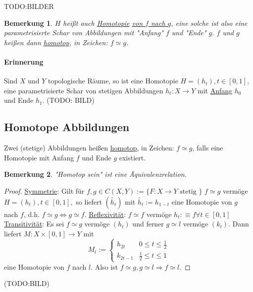 \documentclass[a4paper,11pt,notitlepage]{report}
\newtheorem{remark}{Bemerkung}[chapter]
\newenvironment{Kasten}[1]
{
\hspace{0.05\linewidth}
\begin{center}
\begin{minipage}{0.9\linewidth}
\setlength{\fboxsep}{10pt}
\definecolor{shadecolor}{gray}{1}
\definecolor{framecolor}{gray}{0}
\def\FrameCommand{\fcolorbox{framecolor}{shadecolor}}
\MakeFramed {\FrameRestore}
\subsection{#1}
\begin{itshape}
}
{
\end{itshape}
\endMakeFramed
\end{minipage}
\end{center}
}
\begin{document}
TODO:BILDER

\begin{remark}
$H$ heißt auch \underline{Homotopie} \underline{\underline{von $f$ nach $g$}}, eine solche ist also eine parametrisierte Schar von Abbildungen mit "Anfang" $f$ und "Ende" $g$. $f$ und $g$ heißen dann \underline{homotop}, in Zeichen: $f \simeq g$.
\end{remark}

\paragraph{Erinnerung}
Sind $X$ und $Y$ topologische Räume, so ist eine Homotopie $H = (h_t), t \in [0,1]$, eine parametrisierte Schar von stetigen Abbildungen $h_t \colon X \rightarrow Y$ mit \underline{Anfang} $h_0$ und Ende $h_1$. (TODO: BILD)

\begin{Kasten}{Homotope Abbildungen}
	Zwei (stetige) Abbildungen heißen \underline{homotop}, in Zeichen: $f \simeq g$, falls eine Homotopie mit Anfang $f$ und Ende $g$ existiert.
\end{Kasten}

\begin{remark}
"Homotop sein" ist eine Äquivalenzrelation.
\end{remark}

\begin{proof}
	\underline{Symmetrie}:
	Gilt für $f,g \in C(X,Y) := \{F \colon X \rightarrow Y \text{ stetig } \}$ $f \simeq g$ vermöge $H=(h_t), t \in [0,1],$ so liefert $(\tilde{h_t})$ mit $\tilde{h_t}:=h_{1-t}$ eine Homotopie von $g$ nach $f$, d.h. $f \simeq g \Leftrightarrow g \simeq f$.
	\newline
	\underline{Reflexivität}:
	$f \simeq f$ vermöge $h_t : \equiv f \forall t \in [0,1]$
	\newline
	\underline{Transitivität}:
	Es sei $f \simeq g$ vermöge $(h_t)$ und ferner $g \simeq l$ vermöge $(k_t)$.
	Dann liefert $M \colon X \times [0,1] \rightarrow Y$ mit
	$$M_t := \begin{cases} h_{2t} & 0 \leq t \leq \frac{1}{2} \\
	k_{2t-1} & \frac{1}{2} \leq t \leq 1
	\end{cases}$$
	eine Homotopie von $f$ nach $l$.
	\newline
	Also ist $f \simeq g, g \simeq l \Rightarrow f \simeq l$.
\end{proof}
(TODO:BILD)
\end{document}

